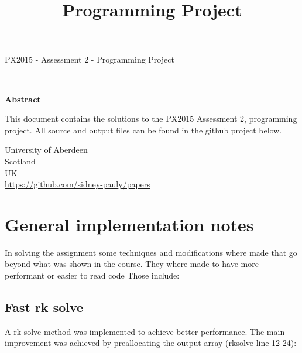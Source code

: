 \documentclass[14pt]{article}
\begin{document}
\title{Programming Project}
\date{}




\fancyhf{}



\begin{titlepage}
  \begin{center}
    \Large
    \textbf{\thetitle}
        
    \vspace{0.4cm}
    \large
    PX2015 - Assessment 2 - Programming Project
        
    \vspace{0.4cm}
    \textbf{\theauthor}\\
    \textbf{\theuoastudentid}

       
    \vspace{0.9cm}
    \textbf{Abstract}
  \end{center}
  This document contains the solutions to the PX2015 Assessment 2, programming project.
  All source and output files can be found in the github project below.

  \vfill

  \begin{center}

    University of Aberdeen\\
    Scotland\\
    UK\\
    \thedate
    \vspace{0.4cm}
    \url{https://github.com/sidney-pauly/papers}
  \end{center}
\end{titlepage}

\section{General implementation notes}
In solving the assignment some techniques and modifications where made that go beyond what was shown in the course. They where made to have more performant or easier to read code
Those include:

\subsection{Fast rk solve}
A rk solve method was implemented to achieve better performance. The main improvement was achieved by preallocating the output array (rksolve line 12-24):
\inputminted[linenos, firstline=12, lastline=24]{octave}{./matlab/rksolve.m}
\end{document}
